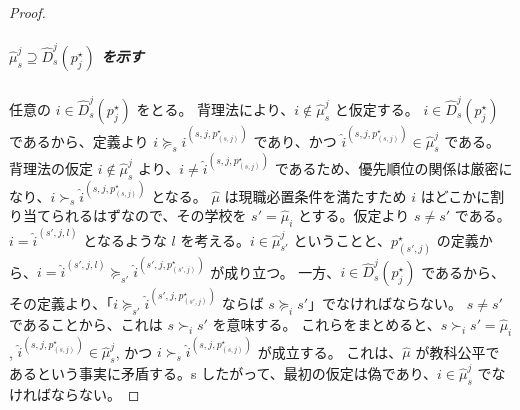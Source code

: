 \documentclass[12pt, a4paper]{article}
\theoremstyle{definition}
\theoremstyle{remark}
\theoremstyle{plain}
\begin{document}
\begin{proof}


\subparagraph{\(\widehat{\mu}_s^j \supseteq \widehat{D}_s^j(p_j^\star)\) を示す}
任意の \(i \in \widehat{D}_s^j(p_j^\star)\) をとる。
背理法により、$i \notin \widehat{\mu}_s^j$ と仮定する。
\(i \in \widehat{D}_s^j(p_j^\star)\) であるから、定義より \(i \succeq_s \widehat{i}^{(s,j,p_{(s,j)}^\star)}\) であり、かつ $\widehat{i}^{(s,j,p_{(s,j)}^\star)} \in \widehat{\mu}_s^j$ である。
背理法の仮定 \(i \notin \widehat{\mu}_s^j\) より、$i \neq \widehat{i}^{(s,j,p_{(s,j)}^\star)}$ であるため、優先順位の関係は厳密になり、$i \succ_s \widehat{i}^{(s,j,p_{(s,j)}^\star)}$ となる。
$\widehat{\mu}$ は現職必置条件を満たすため \(i\) はどこかに割り当てられるはずなので、その学校を $s' = \widehat{\mu}_i$ とする。仮定より $s \neq s'$ である。
$i = \widehat{i}^{(s',j,l)}$ となるような $l$ を考える。$i \in \widehat{\mu}_{s'}^j$ ということと、$p_{(s',j)}^\star$ の定義から、$i = \widehat{i}^{(s',j, l)} \succeq_{s'} \widehat{i}^{(s',j,p_{(s',j)}^\star)}$ が成り立つ。
一方、$i \in \widehat{D}_s^j(p_j^\star)$ であるから、その定義より、「$i \succeq_{s'} \widehat{i}^{(s',j,p_{(s',j)}^\star)}$ ならば $s \succeq_i s'$」でなければならない。
$s \neq s'$ であることから、これは $s \succ_i s'$ を意味する。
これらをまとめると、$s \succ_i s' = \widehat{\mu}_i$, $\widehat{i}^{(s,j,p_{(s,j)}^\star)} \in \widehat{\mu}_s^j$, かつ $i \succ_s \widehat{i}^{(s,j,p_{(s,j)}^\star)}$ が成立する。
これは、$\widehat{\mu}$ が教科公平であるという事実に矛盾する。s
したがって、最初の仮定は偽であり、$i \in \widehat{\mu}_s^j$ でなければならない。



\end{proof}
\end{document}
